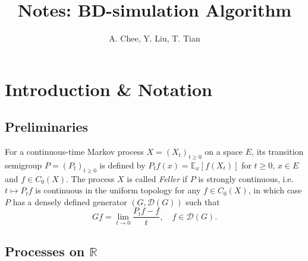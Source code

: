 \documentclass[11pt,a4,reqno]{amsart}
\title{\bf Notes: BD-simulation Algorithm}
\author{A. Chee, Y. Liu, T. Tian}
\numberwithin{equation}{section}
\theoremstyle{definition}
\theoremstyle{remark}
\newcommand{\bb}[1]{\mathbb{#1}}
\newcommand{\cl}[1]{\mathcal{#1}}
\newcommand{\E}{\bb{E}}
\newcommand{\R}{\bb{R}}
\newcommand{\beq}{\begin{equation}}
\newcommand{\eeq}{\end{equation}}
\begin{document}
\maketitle


\section{Introduction \& Notation}

\subsection{Preliminaries}

	For a continuous-time Markov process $X = (X_t)_{t \geq 0}$ on a space $E$, its transition semigroup $P = (P_t)_{t \geq 0}$ is defined by $P_tf(x) = \E_x[f(X_t)]$ for $t \geq 0$, $x \in E$ and $f \in C_0(X)$. The process $X$ is called \textit{Feller} if $P$ is strongly continuous, i.e. $t \mapsto P_tf$ is continuous in the uniform topology for any $f \in C_0(X)$, in which case $P$ has a densely defined generator $(G, \cl{D}(G))$ such that 
		\beq Gf = \lim_{t \to 0} \frac{P_tf - f}{t}, \quad f \in \cl{D}(G). \eeq
		
	
\subsection{Processes on $\R$}
\end{document}
